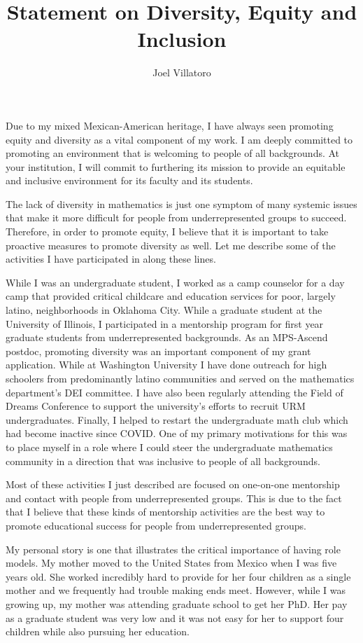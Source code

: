 \documentclass{article}
\title{Statement on Diversity, Equity and Inclusion}
\author{Joel Villatoro}
\date{}
\begin{document}
\vspace{-0.5in}
\maketitle

Due to my mixed Mexican-American heritage, I have always seen promoting equity and diversity as a vital component of my work. I am deeply committed to promoting an environment that is welcoming to people of all backgrounds. At your institution, I will commit to furthering its mission to provide an equitable and inclusive environment for its faculty and its students.

The lack of diversity in mathematics is just one symptom of many systemic issues that make it more difficult for people from underrepresented groups to succeed. Therefore, in order to promote equity, I believe that it is important to take proactive measures to promote diversity as well. Let me describe some of the activities I have participated in along these lines.

While I was an undergraduate student, I worked as a camp counselor for a day camp that provided critical childcare and education services for poor, largely latino, neighborhoods in Oklahoma City. While a graduate student at the University of Illinois, I participated in a mentorship program for first year graduate students from underrepresented backgrounds. As an MPS-Ascend postdoc, promoting diversity was an important component of my grant application. While at Washington University I have done outreach for high schoolers from predominantly latino communities and served on the mathematics department's DEI committee. I have also been regularly attending the Field of Dreams Conference to support the university's efforts to recruit URM undergraduates. Finally, I helped to restart the undergraduate math club which had become inactive since COVID. One of my primary motivations for this was to place myself in a role where I could steer the undergraduate mathematics community in a direction that was inclusive to people of all backgrounds.

Most of these activities I just described are focused on one-on-one mentorship and contact with people from underrepresented groups. This is due to the fact that I believe that these kinds of mentorship activities are the best way to promote educational success for people from underrepresented groups.

My personal story is one that illustrates the critical importance of having role models. My mother moved to the United States from Mexico when I was five years old. She worked incredibly hard to provide for her four children as a single mother and we frequently had trouble making ends meet. However, while I was growing up, my mother was attending graduate school to get her PhD. Her pay as a graduate student was very low and it was not easy for her to support four children while also pursuing her education. 
\end{document}
